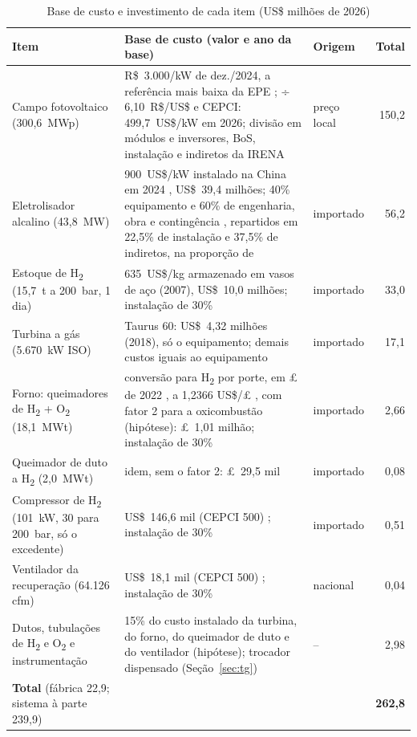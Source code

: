 \documentclass[10pt,a4paper,twocolumn]{article}
\newcommand{\Ht}{H\textsubscript{2}}
\newcommand{\Ot}{O\textsubscript{2}}
\begin{document}
\begin{table}[!t]
\centering
\caption{Base de custo e investimento de cada item (US\$ milhões de 2026)}\label{tab:bases}
\footnotesize
\begin{tabular}{L{4.1cm}L{10.0cm}L{1.5cm}r}
\toprule
\textbf{Item} & \textbf{Base de custo (valor e ano da base)} & \textbf{Origem} & \textbf{Total}\\ \midrule
Campo fotovoltaico (300,6~MWp) & R\$~3.000/kW de dez./2024, a referência mais baixa da EPE \cite{epe2025}; ÷ 6,10~R\$/US\$ e CEPCI: 499,7~US\$/kW em 2026; divisão em módulos e inversores, BoS, instalação e indiretos da IRENA \cite{irena2025} & preço local & 150,2\\
Eletrolisador alcalino (43,8~MW) & 900~US\$/kW instalado na China em 2024 \cite{iea2025a}, US\$~39,4 milhões; 40\% equipamento e 60\% de engenharia, obra e contingência \cite{iea2025a}, repartidos em 22,5\% de instalação e 37,5\% de indiretos, na proporção de \cite{james2024} & importado & 56,2\\
Estoque de \Ht{} (15,7~t a 200~bar, 1 dia) & 635~US\$/kg armazenado em vasos de aço (2007), US\$~10,0 milhões; instalação de 30\% \cite{nrel2014} & importado & 33,0\\
Turbina a gás (5.670~kW ISO) & Taurus 60: US\$~4,32 milhões (2018), só o equipamento; demais custos iguais ao equipamento \cite{gtw2018} & importado & 17,1\\
Forno: queimadores de \Ht{} + \Ot{} (18,1~MWt) & conversão para \Ht{} por porte, em £ de 2022 \cite{arup2022}, a 1,2366 US\$/£ \cite{valutafx}, com fator 2 para a oxicombustão (hipótese): £~1,01 milhão; instalação de 30\% \cite{nrel2014} & importado & 2,66\\
Queimador de duto a \Ht{} (2,0~MWt) & idem, sem o fator 2: £~29,5 mil & importado & 0,08\\
Compressor de \Ht{} (101~kW, 30 para 200~bar, só o excedente) & US\$~146,6 mil (CEPCI 500) \cite{seider2017}; instalação de 30\% \cite{nrel2014} & importado & 0,51\\
Ventilador da recuperação (64.126 cfm) & US\$~18,1 mil (CEPCI 500) \cite{seider2017}; instalação de 30\% \cite{nrel2014} & nacional & 0,04\\
Dutos, tubulações de \Ht{} e \Ot{} e instrumentação & 15\% do custo instalado da turbina, do forno, do queimador de duto e do ventilador (hipótese); trocador dispensado (Seção~\ref{sec:tg}) & -- & 2,98\\
\midrule
\textbf{Total} (fábrica 22,9; sistema à parte 239,9) & & & \textbf{262,8}\\
\bottomrule
\end{tabular}
\end{table}
\end{document}
